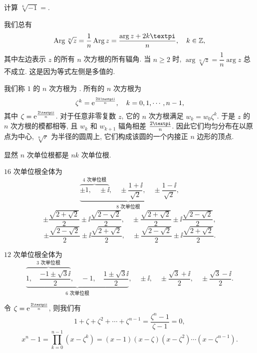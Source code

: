 \begin{exercise}
  计算 $\sqrt[6]{-1}=$\fillblank[9em]{}.
\end{exercise}

我们总有
\begin{equation}
  \label{eq:Arg-root-equality}
  \Arg \sqrt[n]z=\frac1n\Arg z=\frac{\arg z+2k\cpi}n,\quad k\in\BZ,
\end{equation}
其中左边表示 $z$ 的所有 $n$ 次方根的所有辐角.
当 $n\ge 2$ 时, $\arg \sqrt[n]z=\dfrac 1n\arg z$ \alert{总不成立}.
这是因为等式左侧是多值的.

我们称 $1$ 的 $n$ 次方根为 .
所有的 $n$ 次方根为
\[
  \zeta^k=\ee^{\frac{2k\cpi \ii}n},\quad k=0,1,\cdots,n-1,
\]
其中 $\zeta=\ee^{\frac{2\cpi \ii}n}$.
对于任意非零复数 $z$, 它的 $n$ 次方根满足 $w_k=w_0\zeta^k$.
于是 $z$ 的 $n$ 次方根的模都相等, 且 $w_k$ 和 $w_{k+1}$ 辐角相差 $\frac{2\cpi}n$.
因此\alert{它们均匀分布在以原点为中心, $\sqrt[n]r$ 为半径的圆周上}, 它们构成该圆的一个内接正 $n$ 边形的顶点.

\begin{example}
  显然 $n$ 次单位根都是 $nk$ 次单位根.
  \begin{enumr}
    \item $16$ 次单位根全体为
    \[
      \underbrace{
        \overbrace{
          \pm1,\quad
          \pm \ii
        }^{\text{$4$ 次单位根}},\quad
        \pm\frac{1+\ii}{\sqrt2},\quad
        \pm\frac{1-\ii}{\sqrt2}
      }_{\text{$8$ 次单位根}},
    \]
    \[
      \pm\frac{\sqrt{2+\sqrt2}}2\pm\ii\frac{\sqrt{2-\sqrt2}}2,\quad
      \pm\frac{\sqrt{2+\sqrt2}}2\pm\ii\frac{\sqrt{2-\sqrt2}}2,
    \]
    \[
      \pm\frac{\sqrt{2-\sqrt2}}2\pm\ii\frac{\sqrt{2+\sqrt2}}2,\quad
      \pm\frac{\sqrt{2-\sqrt2}}2\pm\ii\frac{\sqrt{2+\sqrt2}}2.
    \]
    \vspace{-\baselineskip}
    \item $12$ 次单位根全体为
    \[
      \underbrace{
        \overbrace{
          1,\quad
          \frac{-1\pm\sqrt3\ii}2
        }^{\text{$3$ 次单位根}},\quad
        -1,\quad
        \frac{1\pm\sqrt3\ii}2
      }_{\text{$6$ 次单位根}},\quad
      \pm\ii,\quad
      \pm\frac{\sqrt 3+\ii}2,\quad
      \pm\frac{\sqrt 3-\ii}2.
    \]
    \vspace{-\baselineskip}
    \item 令 $\zeta=\ee^{\frac{2\cpi \ii}n}$, 则我们有
    \[
      1+\zeta+\zeta^2+\cdots+\zeta^{n-1}
      =\frac{\zeta^n-1}{\zeta-1}=0,
    \]
    \[
        x^n-1
      =\prod_{k=0}^{n-1}(x-\zeta^k)
      =(x-1)(x-\zeta)(x-\zeta^2)\cdots(x-\zeta^{n-1}).
    \]
  \end{enumr}
\end{example}


